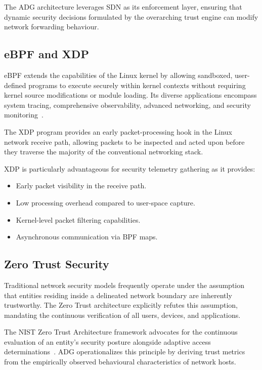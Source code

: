 \documentclass[conference]{IEEEtran}
\begin{document}
The ADG architecture leverages SDN as its enforcement layer, ensuring that dynamic security decisions formulated by the overarching trust engine can modify network forwarding behaviour.

\subsection{eBPF and XDP}
eBPF extends the capabilities of the Linux kernel by allowing sandboxed, user-defined programs to execute securely within kernel contexts without requiring kernel source modifications or module loading. Its diverse applications encompass system tracing, comprehensive observability, advanced networking, and security monitoring~\cite{ebpf}.

The XDP program provides an early packet-processing hook in the Linux network receive path, allowing packets to be inspected and acted upon before they traverse the majority of the conventional networking stack.

XDP is particularly advantageous for security telemetry gathering as it provides:
\begin{itemize}
\item Early packet visibility in the receive path.
\item Low processing overhead compared to user-space capture.
\item Kernel-level packet filtering capabilities.
\item Asynchronous communication via BPF maps.
\end{itemize}

\subsection{Zero Trust Security}
Traditional network security models frequently operate under the assumption that entities residing inside a delineated network boundary are inherently trustworthy. The Zero Trust architecture explicitly refutes this assumption, mandating the continuous verification of all users, devices, and applications.

The NIST Zero Trust Architecture framework advocates for the continuous evaluation of an entity's security posture alongside adaptive access determinations~\cite{nist800207}. ADG operationalizes this principle by deriving trust metrics from the empirically observed behavioural characteristics of network hosts.

\end{document}
